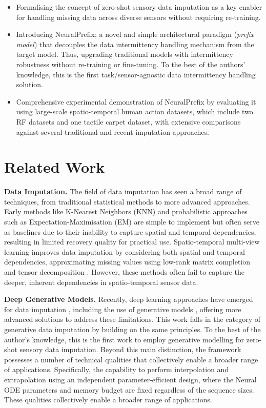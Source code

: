 \documentclass[10pt, conference, compsocconf]{IEEEtran}
\def\update#1{#1}
\begin{document}
\begin{itemize}
    \item Formalising the concept of zero-shot sensory data imputation as a key enabler for handling missing data
across diverse sensors without requiring re-training.
    \item Introducing NeuralPrefix; a novel and simple architectural paradigm (\textit{prefix model}) that decouples the data intermittency handling mechanism from the target model. Thus, upgrading traditional models with intermittency robustness without re-training or fine-tuning. To the best of the authors' knowledge, this is the first task/sensor-agnostic data intermittency handling solution. 
    
   \item Comprehensive experimental demonstration of NeuralPrefix by evaluating it using large-scale spatio-temporal human action datasets, which include two RF datasets and one tactile carpet dataset, with extensive comparisons against several traditional and recent imputation approaches.
\end{itemize}

\section{Related Work}
\label{sec:related_work}

\update{\textbf{Data Imputation.}} The field of data imputation has seen a broad range of techniques, from traditional statistical methods to more advanced approaches. Early methods like K-Nearest Neighbors (KNN) \cite{knn} and probabilistic approaches such as Expectation-Maximisation (EM) \cite{EM} are simple to implement but often serve as baselines due to their inability to capture spatial and temporal dependencies, resulting in limited recovery quality for practical use. Spatio-temporal multi-view learning \cite{ST-MVL} improves data imputation by considering both spatial and temporal dependencies, approximating missing values using low-rank matrix completion \cite{LRMC,ensemble} and tensor decomposition \cite{tensor,tensor2}. However, these methods often fail to capture the deeper, inherent dependencies in spatio-temporal sensor data.

\textbf{Deep Generative Models.} Recently, deep learning approaches have emerged for data imputation \cite{wang2024deep, sun2023deep}, including the use of generative models \cite{adhikari2022comprehensive, shahbazian2023generative}, offering more advanced solutions to address these limitations.
This work falls in the category of generative data imputation by building on the same principles. To the best of the author's knowledge, this is the first work to employ generative modelling for zero-shot sensory data imputation. Beyond this main distinction, the framework possesses a number of technical qualities that collectively enable a broader range of applications. Specifically, the capability to perform interpolation and extrapolation using an independent parameter-efficient design, where the Neural ODE parameters and memory budget are fixed regardless of the sequence sizes. These qualities collectively enable a broader range of applications. 
\end{document}
